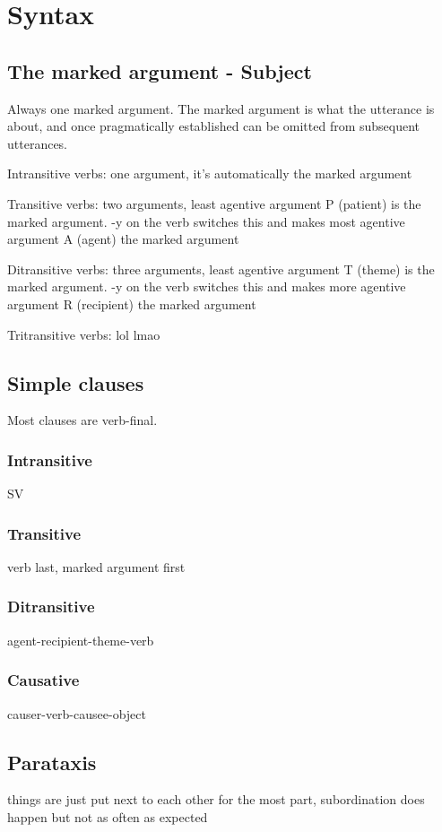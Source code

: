 \documentclass[executivepaper,10pt,twoside,openany,draft]{memoir}
\begin{document}
\chapter{Syntax}


\section{The marked argument - Subject}

Always one marked argument. The marked argument is what the utterance is about, and once pragmatically established can be omitted from subsequent utterances. 

Intransitive verbs: one argument, it's automatically the marked argument

Transitive verbs: two arguments, least agentive argument P (patient) is the marked argument. -y on the verb switches this and makes most agentive argument A (agent) the marked argument

Ditransitive verbs: three arguments, least agentive argument T (theme) is the marked argument. -y on the verb switches this and makes more agentive argument R (recipient) the marked argument

Tritransitive verbs: lol lmao

\section{Simple clauses}

Most clauses are verb-final. 

\subsection{Intransitive}

SV

\subsection{Transitive}

verb last, marked argument first

\subsection{Ditransitive}

agent-recipient-theme-verb

\subsection{Causative}

causer-verb-causee-object 

\section{Parataxis}

things are just put next to each other for the most part, subordination does happen but not as often as expected
\end{document}
